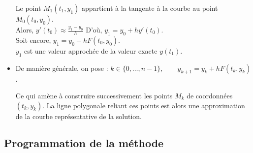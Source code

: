 \begin{itemize}
\begin{minipage}{0.5\linewidth}
		Le point $M_1(t_1,y_1)$ appartient à la tangente à la courbe au point $M_0(t_0,y_0)$.\\
		Alors, $y'(t_0) \approx \displaystyle\frac{y_1-y_0}{h}$
		D'où, $y_1=y_0+hy'(t_0)$.\\
		Soit encore, $y_1=y_0+hF(t_0,y_0)$.\\
		$y_1$ est une valeur approchée de la valeur exacte $y(t_1)$.
		
	\end{minipage}
	
	
	
	\item De manière générale, on pose : $ k\in\{0,\dots,n-1\},\qquad y_{k+1}=y_k+hF(t_k,y_k)$.
	
	Ce qui amène à construire successivement les points $M_k$ de coordonnées $(t_k,y_k)$. La ligne polygonale reliant ces points est alors une approximation de la courbe représentative de la solution.
	
\end{itemize}

\subsection*{Programmation de la méthode }


	
